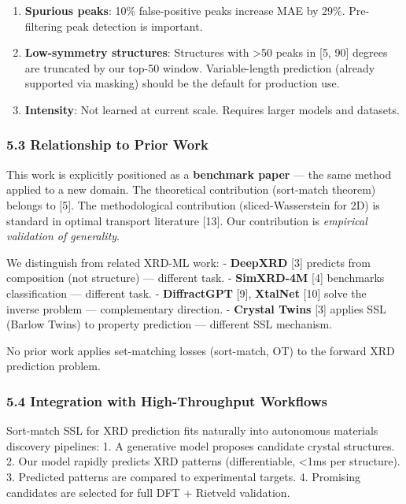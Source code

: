 \documentclass[
  11pt,
]{article}
\providecommand{\tightlist}{%
  \setlength{\itemsep}{0pt}\setlength{\parskip}{0pt}}
\begin{document}
\begin{enumerate}
\def\labelenumi{\arabic{enumi}.}
\tightlist
\item
  \textbf{Spurious peaks}: 10\% false-positive peaks increase MAE by
  29\%. Pre-filtering peak detection is important.
\item
  \textbf{Low-symmetry structures}: Structures with \textgreater50 peaks
  in {[}5, 90{]} degrees are truncated by our top-50 window.
  Variable-length prediction (already supported via masking) should be
  the default for production use.
\item
  \textbf{Intensity}: Not learned at current scale. Requires larger
  models and datasets.
\end{enumerate}

\subsubsection{5.3 Relationship to Prior
Work}\label{relationship-to-prior-work}

This work is explicitly positioned as a \textbf{benchmark paper} --- the
same method applied to a new domain. The theoretical contribution
(sort-match theorem) belongs to {[}5{]}. The methodological contribution
(sliced-Wasserstein for 2D) is standard in optimal transport literature
{[}13{]}. Our contribution is \emph{empirical validation of generality}.

We distinguish from related XRD-ML work: - \textbf{DeepXRD} {[}3{]}
predicts from composition (not structure) --- different task. -
\textbf{SimXRD-4M} {[}4{]} benchmarks classification --- different task.
- \textbf{DiffractGPT} {[}9{]}, \textbf{XtalNet} {[}10{]} solve the
inverse problem --- complementary direction. - \textbf{Crystal Twins}
{[}3{]} applies SSL (Barlow Twins) to property prediction --- different
SSL mechanism.

No prior work applies set-matching losses (sort-match, OT) to the
forward XRD prediction problem.

\subsubsection{5.4 Integration with High-Throughput
Workflows}\label{integration-with-high-throughput-workflows}

Sort-match SSL for XRD prediction fits naturally into autonomous
materials discovery pipelines: 1. A generative model proposes candidate
crystal structures. 2. Our model rapidly predicts XRD patterns
(differentiable, \textless1ms per structure). 3. Predicted patterns are
compared to experimental targets. 4. Promising candidates are selected
for full DFT + Rietveld validation.
\end{document}
